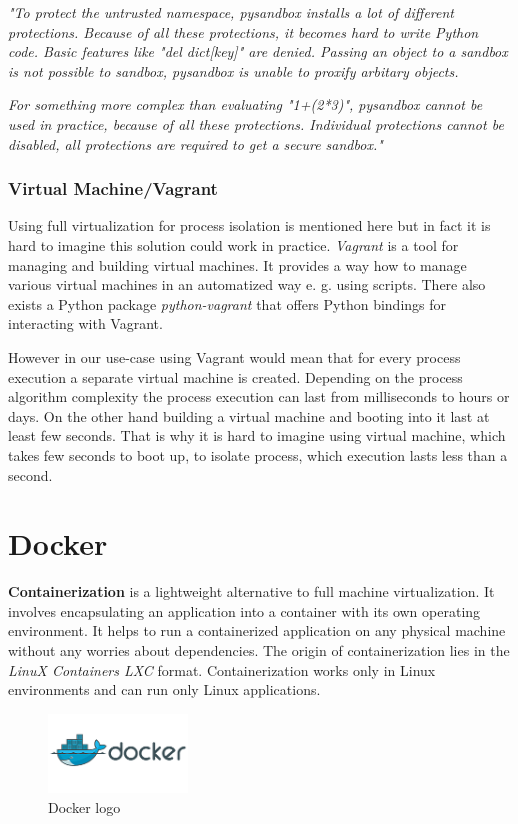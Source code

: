 \documentclass[12pt,a4paper]{article}
\begin{document}
\textit{
"To protect the untrusted namespace, pysandbox installs a lot of
different protections. Because of all these protections, it becomes
hard to write Python code. Basic features like "del dict[key]" are
denied. Passing an object to a sandbox is not possible to sandbox,
pysandbox is unable to proxify arbitary objects.}

\textit{
For something more complex than evaluating "1+(2*3)", pysandbox cannot
be used in practice, because of all these protections. Individual
protections cannot be disabled, all protections are required to get a
secure sandbox."}

\subsubsection{Virtual Machine/Vagrant}
Using full virtualization for process isolation is mentioned here but in fact it is hard to imagine this solution could work
in practice. \textit{Vagrant} is a tool for managing and building virtual machines. It provides a way how to manage various virtual 
machines in an automatized way e. g. using scripts. There also exists a Python package \textit{python-vagrant} that offers 
Python bindings for interacting with Vagrant.

However in our use-case using Vagrant would mean that for every process execution a separate virtual machine is created. Depending
on the process algorithm complexity the process execution can last from milliseconds to hours or days. On the other hand building 
a virtual machine and booting into it last at least few seconds. That is why it is hard to imagine using virtual machine, which takes
few seconds to boot up, to isolate process, which execution lasts less than a second.

\newpage
\section{Docker}
\textbf{Containerization} is a lightweight alternative to full machine virtualization. It involves encapsulating an application 
into a container with its own operating environment. It helps to run a containerized application on any physical machine without any
worries about dependencies. The origin of containerization lies in the \textit{LinuX Containers {LXC}} format. Containerization
works only in Linux environments and can run only Linux applications.

\begin{figure}[h!]
\centering
\includegraphics[width=0.33\textwidth]{img/Docker_logo}
\caption{Docker logo}
\label{fig:Docker_logo}
\end{figure}
\end{document}
